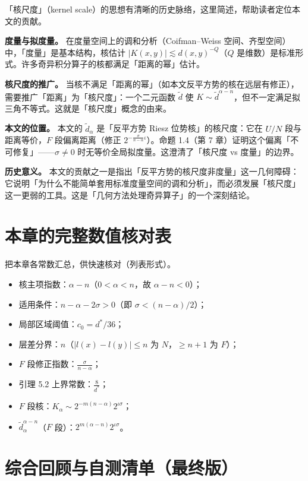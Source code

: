 \documentclass[a4paper,11pt,openany]{ctexbook}
\numberwithin{equation}{chapter}
\numberwithin{figure}{chapter}
\numberwithin{table}{chapter}
\begin{document}
「核尺度」（kernel scale）的思想有清晰的历史脉络，这里简述，帮助读者定位本文的贡献。

\textbf{度量与拟度量。} 在度量空间上的调和分析（Coifman–Weiss 空间、齐型空间）中，「度量」是基本结构，核估计 $|K(x,y)|\lesssim d(x,y)^{-Q}$（$Q$ 是维数）是标准形式。许多奇异积分算子的核都满足「距离的幂」估计。

\textbf{核尺度的推广。} 当核不满足「距离的幂」（如本文反平方势的核在远层有修正），需要推广「距离」为「核尺度」：一个二元函数 $\widetilde d$ 使 $K\sim\widetilde d^{\alpha-n}$，但不一定满足拟三角不等式。这就是「核尺度」概念的由来。

\textbf{本文的位置。} 本文的 $\widetilde d_\alpha$ 是「反平方势 Riesz 位势核」的核尺度：它在 $U/N$ 段与距离等价，$F$ 段偏离距离（修正 $2^{-\frac{\sigma}{n-\alpha}\iota}$）。命题 1.4（第 7 章）证明这个偏离「不可修复」——$\sigma\neq0$ 时无等价全局拟度量。这澄清了「核尺度 vs 度量」的边界。

\textbf{历史意义。} 本文的贡献之一是指出「反平方势的核尺度非度量」这一几何障碍：它说明「为什么不能简单套用标准度量空间的调和分析」，而必须发展「核尺度」这一更弱的工具。这是「几何方法处理奇异算子」的一个深刻结论。

\section{本章的完整数值核对表}

把本章各常数汇总，供快速核对（列表形式）。

\begin{itemize}
\item 核主项指数：$\alpha-n$（$0<\alpha<n$，故 $\alpha-n<0$）；
\item 适用条件：$n-\alpha-2\sigma>0$（即 $\sigma<(n-\alpha)/2$）；
\item 局部区域阈值：$c_0=d^*/36$；
\item 层差分界：$n$（$|l(x)-l(y)|\le n$ 为 $N$，$\ge n+1$ 为 $F$）；
\item $F$ 段修正指数：$\frac{\sigma}{n-\alpha}$；
\item 引理 5.2 上界常数：$\frac8{d^*}$；
\item $F$ 段核：$K_\alpha\sim2^{-m(n-\alpha)}2^{\iota\sigma}$；
\item $\widetilde d_\alpha^{\alpha-n}$（$F$ 段）：$2^{m(\alpha-n)}2^{\iota\sigma}$。
\end{itemize}

\section{综合回顾与自测清单（最终版）}
\end{document}
